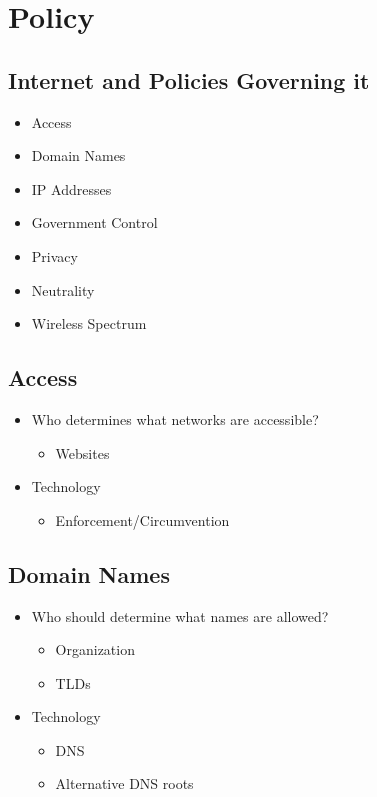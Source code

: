 \section{Policy}
\subsection{Internet and Policies Governing it}
\begin{itemize}[nosep]
    \item Access
    \item Domain Names
    \item IP Addresses
    \item Government Control
    \item Privacy
    \item Neutrality
    \item Wireless Spectrum
\end{itemize}

\subsection{Access}
\begin{itemize}[nosep]
    \item Who determines what networks are accessible?
          \begin{itemize}[nosep]
              \item Websites
          \end{itemize}
    \item Technology
          \begin{itemize}[nosep]
              \item Enforcement/Circumvention
          \end{itemize}
\end{itemize}

\subsection{Domain Names}
\begin{itemize}[nosep]
    \item Who should determine what names are allowed?
          \begin{itemize}[nosep]
              \item Organization
              \item TLDs
          \end{itemize}
    \item Technology
          \begin{itemize}[nosep]
              \item DNS
              \item Alternative DNS roots
          \end{itemize}
\end{itemize}


